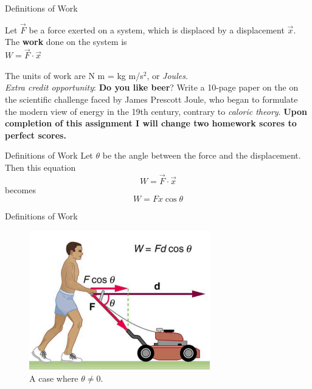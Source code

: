 \documentclass{beamer}
\begin{document}
\begin{frame}{Definitions of Work}
\begin{tcolorbox}[colback=white,colframe=red!40!blue,title=Physical Definition of Work]
\alert{Let $\vec{F}$ be a force exerted on a system, which is displaced by a displacement $\vec{x}$.  The \textbf{work} done on the system is} \\
\alert{$W = \vec{F} \cdot \vec{x}$} \\
\end{tcolorbox}
The units of work are N m = kg m/s$^2$, or \textit{Joules}. \\
\vspace{0.5cm}
\small
\textit{Extra credit opportunity}: \textbf{Do you like beer}?  Write a 10-page paper on the on the scientific challenge faced by James Prescott Joule, who began to formulate the modern view of energy in the 19th century, contrary to \textit{caloric theory}.  \textbf{Upon completion of this assignment I will change two homework scores to perfect scores.}
\end{frame}

\begin{frame}{Definitions of Work}
Let $\theta$ be the angle between the force and the displacement.  Then this equation
\begin{equation}
W = \vec{F} \cdot \vec{x}
\end{equation}
becomes
\begin{equation}
W = Fx\cos\theta
\end{equation}
\end{frame}

\begin{frame}{Definitions of Work}
\begin{figure}
\centering
\includegraphics[width=0.7\textwidth]{figures/lawn.png}
\caption{\label{fig:work} A case where $\theta \neq 0$.}
\end{figure}
\end{frame}
\end{document}
